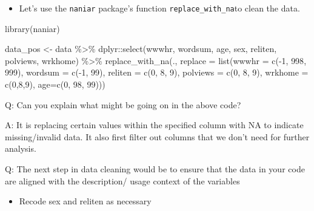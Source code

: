 \documentclass[
  letterpaper,
  DIV=11,
  numbers=noendperiod]{scrartcl}
\newenvironment{Shaded}{\begin{snugshade}}{\end{snugshade}}
\newcommand{\AttributeTok}[1]{\textcolor[rgb]{0.40,0.45,0.13}{#1}}
\newcommand{\DecValTok}[1]{\textcolor[rgb]{0.68,0.00,0.00}{#1}}
\newcommand{\FunctionTok}[1]{\textcolor[rgb]{0.28,0.35,0.67}{#1}}
\newcommand{\NormalTok}[1]{\textcolor[rgb]{0.00,0.23,0.31}{#1}}
\newcommand{\OtherTok}[1]{\textcolor[rgb]{0.00,0.23,0.31}{#1}}
\newcommand{\SpecialCharTok}[1]{\textcolor[rgb]{0.37,0.37,0.37}{#1}}
\providecommand{\tightlist}{%
  \setlength{\itemsep}{0pt}\setlength{\parskip}{0pt}}\usepackage{longtable,booktabs,array}
\begin{document}
\begin{itemize}
\tightlist
\item
  Let's use the \texttt{naniar} package's function
  \texttt{replace\_with\_na}to clean the data.
\end{itemize}

\begin{Shaded}
\begin{Highlighting}[]
\FunctionTok{library}\NormalTok{(naniar)}

\NormalTok{data\_pos }\OtherTok{\textless{}{-}}\NormalTok{ data }\SpecialCharTok{\%\textgreater{}\%}
\NormalTok{  dplyr}\SpecialCharTok{::}\FunctionTok{select}\NormalTok{(wwwhr, wordsum, age, sex, reliten, polviews, wrkhome) }\SpecialCharTok{\%\textgreater{}\%}
\FunctionTok{replace\_with\_na}\NormalTok{(.,}
             \AttributeTok{replace =} \FunctionTok{list}\NormalTok{(}\AttributeTok{wwwhr =} \FunctionTok{c}\NormalTok{(}\SpecialCharTok{{-}}\DecValTok{1}\NormalTok{, }\DecValTok{998}\NormalTok{, }\DecValTok{999}\NormalTok{),}
                          \AttributeTok{wordsum =} \FunctionTok{c}\NormalTok{(}\SpecialCharTok{{-}}\DecValTok{1}\NormalTok{, }\DecValTok{99}\NormalTok{),}
                          \AttributeTok{reliten =} \FunctionTok{c}\NormalTok{(}\DecValTok{0}\NormalTok{, }\DecValTok{8}\NormalTok{, }\DecValTok{9}\NormalTok{), }
             \AttributeTok{polviews =} \FunctionTok{c}\NormalTok{(}\DecValTok{0}\NormalTok{, }\DecValTok{8}\NormalTok{, }\DecValTok{9}\NormalTok{), }
             \AttributeTok{wrkhome =} \FunctionTok{c}\NormalTok{(}\DecValTok{0}\NormalTok{,}\DecValTok{8}\NormalTok{,}\DecValTok{9}\NormalTok{), }
             \AttributeTok{age=}\FunctionTok{c}\NormalTok{(}\DecValTok{0}\NormalTok{, }\DecValTok{98}\NormalTok{, }\DecValTok{99}\NormalTok{)))}
\end{Highlighting}
\end{Shaded}

Q: Can you explain what might be going on in the above code?

A: It is replacing certain values within the specified column with NA to
indicate missing/invalid data. It also first filter out columns that we
don't need for further analysis.

Q: The next step in data cleaning would be to ensure that the data in
your code are aligned with the description/ usage context of the
variables

\begin{itemize}
\tightlist
\item
  Recode sex and reliten as necessary
\end{itemize}
\end{document}
